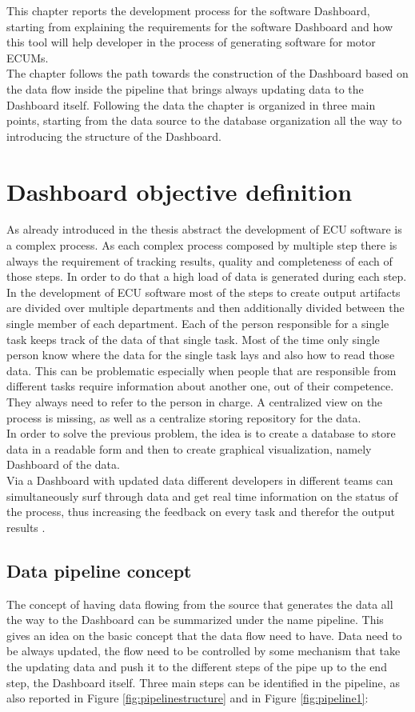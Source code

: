 \documentclass[../main.tex]{subfiles}
\begin{document}
This chapter reports the development process for the software Dashboard, starting from explaining the requirements for the software Dashboard and how this tool will help developer in the process of generating software for motor \gls{ECUM}s.\\ The chapter follows the path towards the construction of the Dashboard based on the data flow inside the pipeline that brings always updating data to the Dashboard itself. Following the data the chapter is organized in three main points, starting from the data source to the database organization all the way to introducing the structure of the Dashboard.
\section{Dashboard objective definition}
As already introduced in the thesis abstract the development of \gls{ECU} software is a complex process. As each complex process composed by multiple step there is always the requirement of tracking results, quality and completeness of each of those steps. In order to do that a high load of data is generated during each step.
In the development of \gls{ECU} software most of the steps to create output artifacts are divided over multiple departments and then additionally divided between the single member of each department. Each of the person responsible for a single task keeps track of the data of that single task. Most of the time only single person know where the data for the single task lays and also how to read those data. This can be problematic especially when people that are responsible from different tasks require information about another one, out of their competence. They always need to refer to the person in charge. A centralized view on the process is missing, as well as a centralize storing repository for the data. \\
In order to solve the previous problem, the idea is to create a database to store data in a readable form and then to create graphical visualization, namely Dashboard of the data.\\
Via a Dashboard with updated data different developers in different teams can simultaneously surf through data and get real time information on the status of the process, thus increasing the feedback on every task and therefor the output results .
\subsection{Data pipeline concept}
The concept of having data flowing from the source that generates the data all the way to the Dashboard can be summarized under the name pipeline. This gives an idea on the basic concept that the data flow need to have. Data need to be always updated, the flow need to be controlled by some mechanism that take the updating data and push it to the different steps of the pipe up to the end step, the Dashboard itself. Three main steps can be identified in the pipeline, as also reported in Figure \ref{fig:pipelinestructure} and in Figure \ref{fig:pipeline1}:
\end{document}
